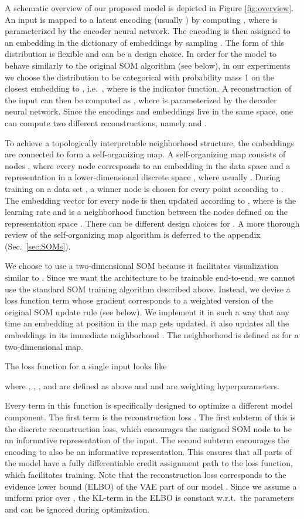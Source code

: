 \documentclass{article}
\begin{document}
A schematic overview of our proposed model is depicted in Figure \ref{fig:overview}.
An input  is mapped to a latent encoding  (usually ) by computing , where  is parameterized by the encoder neural network.
The encoding is then assigned to an embedding  in the dictionary of embeddings  by sampling .
The form of this distribution is flexible and can be a design choice.
In order for the model to behave similarly to the original SOM algorithm (see below), in our experiments we choose the distribution to be categorical with probability mass 1 on the closest embedding to , i.e.\ , where  is the indicator function.
A reconstruction  of the input can then be computed as , where  is parameterized by the decoder neural network.
Since the encodings and embeddings live in the same space, one can compute two different reconstructions, namely  and .

To achieve a topologically interpretable neighborhood structure, the embeddings are connected to form a self-organizing map.
A self-organizing map consists of  nodes , where every node corresponds to an embedding in the data space  and a representation in a lower-dimensional discrete space , where usually .
During training on a data set , a winner node  is chosen for every point  according to .
The embedding vector for every node  is then updated according to , where  is the learning rate and  is a neighborhood function between the nodes defined on the representation space .
There can be different design choices for .
A more thorough review of the self-organizing map algorithm is deferred to the appendix (Sec.~\ref{sec:SOMs}).

We choose to use a two-dimensional SOM because it facilitates visualization similar to \citet{Tirunagari2015}.
Since we want the architecture to be trainable end-to-end, we cannot use the standard SOM training algorithm described above.
Instead, we devise a loss function term whose gradient corresponds to a weighted version of the original SOM update rule (see below).
We implement it in such a way that any time an embedding  at position  in the map gets updated, it also updates all the embeddings in its immediate neighborhood .
The neighborhood is defined as  for a two-dimensional map.

The loss function for a single input  looks like

where , , ,  and  are defined as above and  and  are weighting hyperparameters.

Every term in this function is specifically designed to optimize a different model component.
The first term is the reconstruction loss .
The first subterm of this is the discrete reconstruction loss, which encourages the assigned SOM node  to be an informative representation of the input.
The second subterm encourages the encoding  to also be an informative representation.
This ensures that all parts of the model have a fully differentiable credit assignment path to the loss function, which facilitates training.
Note that the reconstruction loss corresponds to the evidence lower bound (ELBO) of the VAE part of our model \citep{Kingma2013}.
Since we assume a uniform prior over , the KL-term in the ELBO is constant w.r.t.\ the parameters and can be ignored during optimization.
\end{document}
